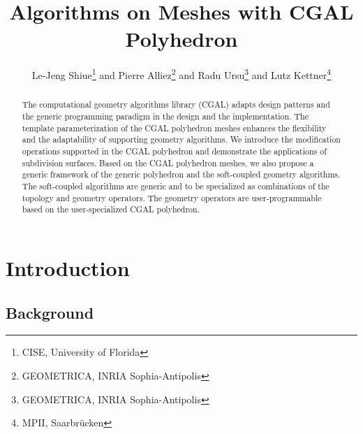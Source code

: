\documentclass{egpubl}
\title{{\LARGE {\sffamily\bfseries Algorithms on Meshes with CGAL Polyhedron}}}
\author[Le-Jeng Shiue \& Pierre Alliez \& Radu Ursu \& Lutz Kettner]
       {Le-Jeng Shiue\thanks{CISE, University of Florida} and
        Pierre Alliez\thanks{GEOMETRICA, INRIA Sophia-Antipolis} and
	Radu Ursu\thanks{GEOMETRICA, INRIA Sophia-Antipolis} and
	Lutz Kettner\thanks{MPII, Saarbr\"ucken}
       }
\begin{document}
\maketitle

\begin{abstract}
  The computational geometry algorithms library (CGAL) adapts
  design patterns and the generic programming paradigm in the design
  and the implementation. The template parameterization 
  of the CGAL polyhedron meshes enhances the flexibility and
  the adaptability of supporting geometry algorithms.
  We introduce the modification operations supported
  in the CGAL polyhedron and demonstrate the applications
  of subdivision surfaces. Based on the CGAL polyhedron meshes, 
  we also propose a generic framework of the generic polyhedron and 
  the soft-coupled geometry algorithms. The soft-coupled algorithms
  are generic and to be specialized as combinations of the
  topology and geometry operators. The geometry operators
  are user-programmable based on the user-specialized CGAL polyhedron.

  \begin{classification} %
  \end{classification}

\end{abstract}


\section{Introduction}

\subsection{Background}
 

\end{document}
